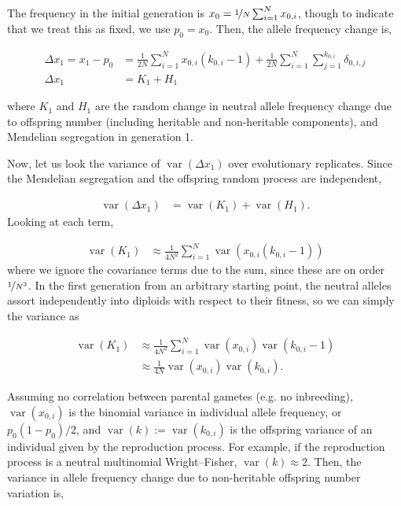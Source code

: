 \documentclass[11pt]{article}
\DeclareMathOperator{\var}{var}
\begin{document}
The frequency in the initial generation is $x_0 = \nicefrac{1}{N} \sum_{i=1}^N
x_{0,i}$, though to indicate that we treat this as fixed, we use $p_0 = x_0$.
Then, the allele frequency change is,

\begin{align}
  \Delta x_1 = x_1 - p_0 &= \frac{1}{2N} \sum_{i=1}^N x_{0,i} (k_{0,i} - 1) + \frac{1}{2N} \sum_{i=1}^N \sum_{j=1}^{k_{0,i}} \delta_{0,i,j} \\
  \Delta x_1 &= K_1 + H_1
\end{align}

where $K_1$ and $H_1$ are the random change in neutral allele frequency change
due to offspring number (including heritable and non-heritable components), and
Mendelian segregation in generation 1.

Now, let us look the variance of $\var(\Delta x_1)$ over evolutionary
replicates. Since the Mendelian segregation and the offspring random process
are independent,

\begin{align}
  \var(\Delta x_1) &= \var(K_1) + \var(H_1).
\end{align}
%
Looking at each term,

\begin{align}
  \var(K_1) &\approx \frac{1}{4N^2} \sum_{i=1}^N \var\left(x_{0,i} (k_{0,i} - 1) \right)
\end{align}
%
where we ignore the covariance terms due to the sum, since these are on order
$\nicefrac{1}{N^3}$. In the first generation from an arbitrary starting point,
the neutral alleles assort independently into diploids with respect to their
fitness, so we can simply the variance as

\begin{align}
  \var(K_1) &\approx \frac{1}{4N^2} \sum_{i=1}^N \var(x_{0,i}) \var(k_{0,i} - 1)  \\
            &\approx \frac{1}{4N} \var(x_{0,i}) \var(k_{0,i}).
\end{align}

Assuming no correlation between parental gametes (e.g. no inbreeding),
$\var(x_{0,i})$ is the binomial variance in individual allele frequency, or
$p_0(1-p_0)/2$, and $\var(k) := \var(k_{0,i})$ is the offspring variance of an
individual given by the reproduction process. For example, if the reproduction
process is a neutral multinomial Wright--Fisher, $\var(k) \approx 2$. Then, the
variance in allele frequency change due to non-heritable offspring number
variation is,
\end{document}
